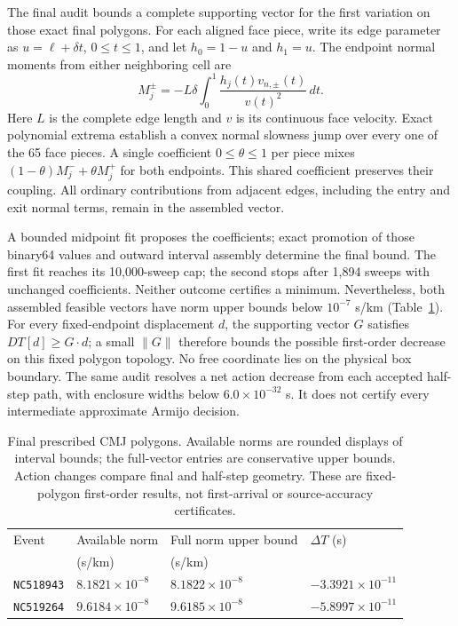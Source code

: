 The final audit bounds a complete supporting vector for the first variation
on those exact final polygons. For each aligned face piece, write its edge parameter as
$u=\ell+\delta t$, $0\leq t\leq1$, and let $h_0=1-u$ and $h_1=u$.
The endpoint normal moments from either neighboring cell are
\begin{equation}
 M_j^{\pm}=-L\delta\int_0^1
       \frac{h_j(t)v_{n,\pm}(t)}{v(t)^2}\,dt .
\end{equation}
Here $L$ is the complete edge length and $v$ is its continuous face velocity.
Exact polynomial extrema establish a convex normal slowness jump over every
one of the 65 face pieces. A single coefficient $0\leq\theta\leq1$ per piece
mixes $(1-\theta)M_j^-+\theta M_j^+$ for both endpoints. This shared coefficient
preserves their coupling. All ordinary contributions from adjacent edges,
including the entry and exit normal terms, remain in the assembled vector.

A bounded midpoint fit proposes the coefficients; exact promotion of those
binary64 values and outward interval assembly determine the final bound.
The first fit reaches its 10,000-sweep cap; the second stops after 1,894 sweeps
with unchanged coefficients. Neither outcome certifies a minimum. Nevertheless,
both assembled feasible vectors have norm upper bounds below $10^{-7}$ s/km
(Table~\ref{tab:cmj_final_support}). For every fixed-endpoint displacement
$d$, the supporting vector $G$ satisfies $D T[d]\geq G\cdot d$; a small
$\lVert G\rVert$ therefore bounds the possible first-order decrease on this
fixed polygon topology. No free coordinate lies on the physical box boundary.
The same audit resolves a net action decrease from each accepted half-step
path, with enclosure widths below $6.0\times10^{-32}$ s. It does not certify
every intermediate approximate Armijo decision.

\begin{table}[ht]
\centering
\caption{Final prescribed CMJ polygons. Available norms are rounded displays
of interval bounds; the full-vector entries are conservative upper bounds.
Action changes compare final and half-step geometry. These are fixed-polygon
first-order results, not first-arrival or source-accuracy certificates.}
\label{tab:cmj_final_support}
\begin{tabular}{llll}
\hline
Event & Available norm & Full norm upper bound & $\Delta T$ (s) \\
      & (s/km) & (s/km) & \\
\hline
\texttt{NC518943} & $8.1821\times10^{-8}$ & $8.1822\times10^{-8}$ & $-3.3921\times10^{-11}$ \\
\texttt{NC519264} & $9.6184\times10^{-8}$ & $9.6185\times10^{-8}$ & $-5.8997\times10^{-11}$ \\
\hline
\end{tabular}
\end{table}

